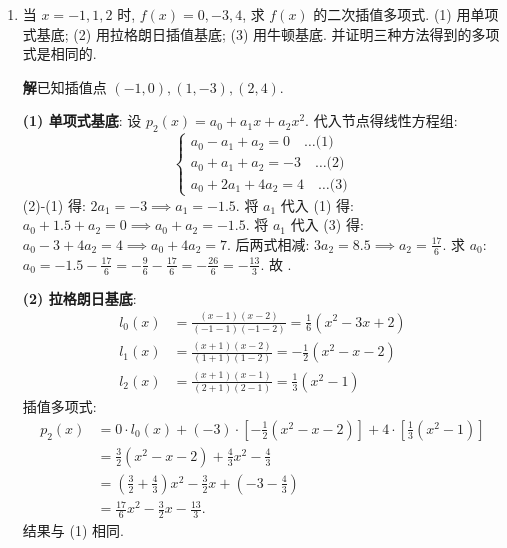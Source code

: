 \documentclass[a4paper,11pt]{ctexart}
\newcommand{\sol}{\par\noindent\textbf{解}\quad}
\begin{document}
\begin{enumerate}[label=\textbf{2-\arabic*.}, leftmargin=*]
    \item 当 $x = -1, 1, 2$ 时, $f(x) = 0, -3, 4$, 求 $f(x)$ 的二次插值多项式.
    (1) 用单项式基底; (2) 用拉格朗日插值基底; (3) 用牛顿基底. 并证明三种方法得到的多项式是相同的.
    
    \sol 已知插值点 $(-1, 0), (1, -3), (2, 4)$.
    
    \textbf{(1) 单项式基底}: 设 $p_2(x) = a_0 + a_1 x + a_2 x^2$.
    代入节点得线性方程组:
    \[
    \begin{cases}
    a_0 - a_1 + a_2 = 0 \quad \dots \text{(1)} \\
    a_0 + a_1 + a_2 = -3 \quad \dots \text{(2)} \\
    a_0 + 2a_1 + 4a_2 = 4 \quad \dots \text{(3)}
    \end{cases}
    \]
    (2)-(1) 得: $2a_1 = -3 \implies a_1 = -1.5$.
    将 $a_1$ 代入 (1) 得: $a_0 + 1.5 + a_2 = 0 \implies a_0 + a_2 = -1.5$.
    将 $a_1$ 代入 (3) 得: $a_0 - 3 + 4a_2 = 4 \implies a_0 + 4a_2 = 7$.
    后两式相减: $3a_2 = 8.5 \implies a_2 = \frac{17}{6}$.
    求 $a_0$: $a_0 = -1.5 - \frac{17}{6} = -\frac{9}{6} - \frac{17}{6} = -\frac{26}{6} = -\frac{13}{3}$.
    故 .
    
    \textbf{(2) 拉格朗日基底}:
    \begin{align*}
    l_0(x) &= \frac{(x-1)(x-2)}{(-1-1)(-1-2)} = \frac{1}{6}(x^2-3x+2) \\
    l_1(x) &= \frac{(x+1)(x-2)}{(1+1)(1-2)} = -\frac{1}{2}(x^2-x-2) \\
    l_2(x) &= \frac{(x+1)(x-1)}{(2+1)(2-1)} = \frac{1}{3}(x^2-1)
    \end{align*}
    插值多项式:
    \begin{align*}
    p_2(x) &= 0 \cdot l_0(x) + (-3) \cdot [-\frac{1}{2}(x^2-x-2)] + 4 \cdot [\frac{1}{3}(x^2-1)] \\
           &= \frac{3}{2}(x^2-x-2) + \frac{4}{3}x^2 - \frac{4}{3} \\
           &= (\frac{3}{2} + \frac{4}{3})x^2 - \frac{3}{2}x + (-3 - \frac{4}{3}) \\
           &= \frac{17}{6}x^2 - \frac{3}{2}x - \frac{13}{3}.
    \end{align*}
    结果与 (1) 相同.
    

\end{enumerate}
\end{document}
